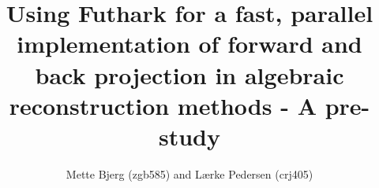 

\title{Using Futhark for a fast, parallel implementation of forward and back projection in algebraic reconstruction methods - A pre-study}
\author{Mette Bjerg (zgb585) and L\ae rke Pedersen (crj405)}
\maketitle
\newpage

\FloatBarrier

\FloatBarrier

\FloatBarrier

\FloatBarrier

\FloatBarrier

\FloatBarrier

\FloatBarrier

\FloatBarrier
\nocite{*}



